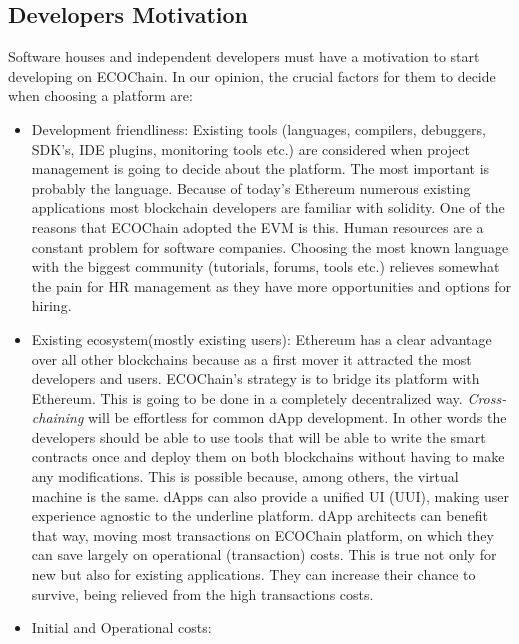 \documentclass{article}
\begin{document}
\subsection{Developers Motivation}
Software houses and independent developers must have a motivation to start developing on ECOChain. In our opinion, the crucial factors for them to decide when choosing a platform are:
\begin{itemize}
\item Development friendliness: 
Existing tools (languages, compilers, debuggers, SDK's, IDE plugins, monitoring tools etc.) are considered when project management is going to decide about the platform. The most important is probably the language. Because of today's Ethereum numerous existing applications most blockchain developers are familiar with solidity. One of the reasons that ECOChain adopted the EVM is this. Human resources are a constant problem for software companies. Choosing the most known language with the biggest community (tutorials, forums, tools etc.) relieves somewhat the pain for HR management as they have more opportunities and options for hiring.
\item Existing ecosystem(mostly existing users):
Ethereum has a clear advantage over all other blockchains because as a first mover it attracted the most developers and users. ECOChain's strategy is to bridge its platform with Ethereum. This is going to be done in a completely decentralized way. \emph{Cross-chaining} will be effortless for common dApp development. In other words the developers should be able to use tools that will be able to write the smart contracts once and deploy them on both blockchains without having to make any modifications. This is possible because, among others, the virtual machine is the same. dApps can also provide a unified UI (UUI), making user experience agnostic to the underline platform. dApp architects can benefit that way, moving most transactions on ECOChain platform, on which they can save largely on operational (transaction) costs. This is true not only for new but also for existing applications. They can increase their chance to survive, being relieved from the high transactions costs.
\item Initial and Operational costs: 

\end{itemize}
\end{document}
